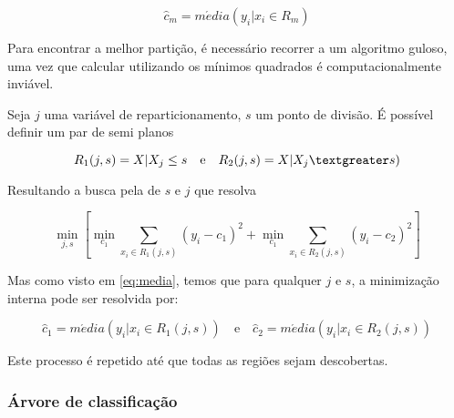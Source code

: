 \begin{equation}
\label{eq:media}
\hat c_{m} = m\acute edia(y_{i} | x_{i} \in R_{m})
\end{equation}

Para encontrar a melhor partição, é necessário recorrer a um algoritmo guloso\footnotemark {}, uma vez que calcular utilizando os mínimos quadrados é computacionalmente inviável.

Seja \begin{math}j\end{math} uma variável de reparticionamento, $s$ um ponto de divisão. É possível definir um par de semi planos 

\begin{equation}
R_{1}(j,s) = {X | X_{j}\leq s} \quad \textrm{e} \quad R_{2}(j,s) = {X | X_{j}\textgreater s})
\end{equation}

Resultando a busca pela de \begin{math}s\end{math} e \begin{math}j\end{math} que resolva

\begin{equation}
\min_{j,s} \left [ \min_{c_{1}} \sum_{x_{i} \in R_{1} (j,s)} (y_{i} - c_{1})^{2} + \min_{c_{1}} \sum_{x_{i} \in R_{2} (j,s)}(y_{i} - c_{2})^{2} \right ]
\end{equation} 


Mas como visto em \ref{eq:media}, temos que para qualquer $j$ e $s$, a minimização interna pode ser resolvida por:

\begin{equation}
\hat c_{1} = m\acute edia(y_{i} | x_{i} \in R_{1}(j,s)) \quad \textrm{e} \quad \hat c_{2} = m\acute edia(y_{i} | x_{i} \in R_{2}(j,s))
\end{equation} 

Este processo é repetido até que todas as regiões sejam descobertas.

\subsubsection{Árvore de classificação}

